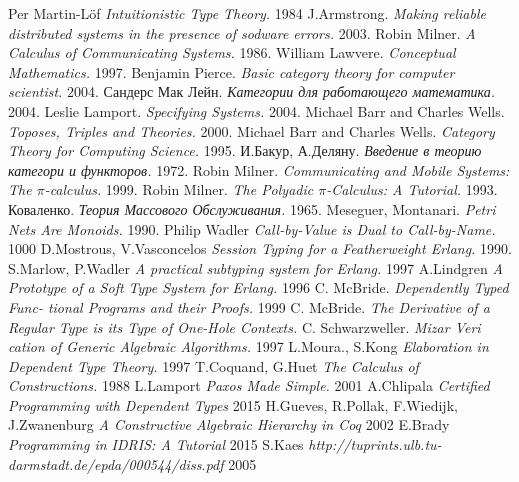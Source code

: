 \documentclass[11pt,oneside]{article}
\begin{document}
\newpage
\begin{thebibliography}{9}

      Per Martin-Löf \textit{Intuitionistic Type Theory.} 1984
      J.Armstrong. \textit{Making reliable distributed systems in the presence of sodware errors.} 2003.
     Robin Milner. \textit{ A Calculus of Communicating Systems.} 1986.
  William Lawvere. \textit{Conceptual Mathematics.} 1997.
   Benjamin Pierce. \textit{Basic category theory for computer scientist.} 2004.
   Сандерс Мак Лейн. \textit{Категории для работающего математика.} 2004.
      Leslie Lamport. \textit{Specifying Systems.} 2004.
  Michael Barr and Charles Wells. \textit{Toposes, Triples and Theories.} 2000.
  Michael Barr and Charles Wells. \textit{Category Theory for Computing Science.} 1995.
    И.Бакур, А.Деляну. \textit{Введение в теорию категори и функторов.} 1972.
   Robin Milner. \textit{Communicating and Mobile Systems: The $\pi$-calculus.} 1999.
   Robin Milner. \textit{The Polyadic $\pi$-Calculus: A Tutorial.} 1993.
     Коваленко. \textit{Теория Массового Обслуживания.} 1965.
 Meseguer, Montanari.  \textit{Petri Nets Are Monoids.} 1990.
  Philip Wadler \textit{Call-by-Value is Dual to Call-by-Name.} 1000
   D.Mostrous, V.Vasconcelos \textit{Session Typing for a Featherweight Erlang.} 1990.
   S.Marlow, P.Wadler \textit{A practical subtyping system for Erlang.} 1997
   A.Lindgren \textit{A Prototype of a Soft Type System for Erlang.} 1996
  C. McBride. \textit{Dependently Typed Func- tional Programs and their Proofs.} 1999
 C. McBride. \textit{The Derivative of a Regular Type is its Type of One-Hole Contexts.}
  C. Schwarzweller. \textit{Mizar Veri cation of Generic Algebraic Algorithms.} 1997
  L.Moura., S.Kong \textit{Elaboration in Dependent Type Theory.} 1997
  T.Coquand, G.Huet \textit{The Calculus of Constructions.} 1988
   L.Lamport \textit{Paxos Made Simple.} 2001
   A.Chlipala \textit{Certified Programming with Dependent Types} 2015
   H.Gueves, R.Pollak, F.Wiedijk, J.Zwanenburg \textit{A Constructive Algebraic Hierarchy in Coq} 2002
    E.Brady \textit{Programming in IDRIS: A Tutorial} 2015
     S.Kaes \textit{http://tuprints.ulb.tu-darmstadt.de/epda/000544/diss.pdf} 2005
\end{thebibliography}
\end{document}
